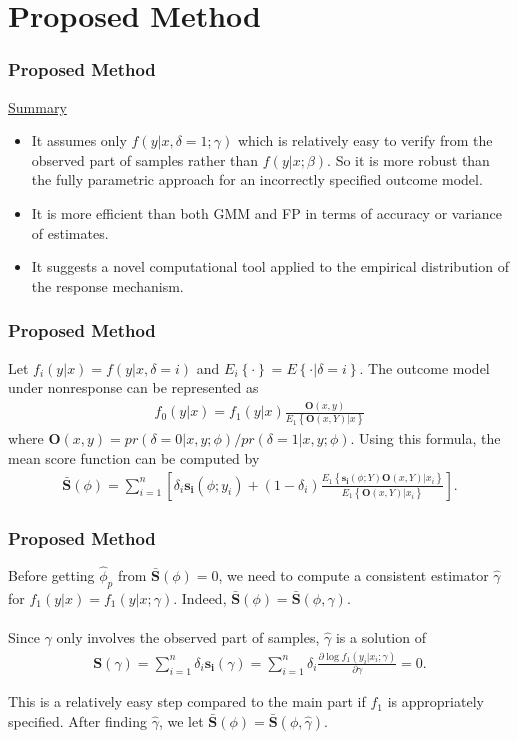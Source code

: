 \documentclass{beamer}
\newcommand{\bra}[1]{\left(#1\right)}
\newcommand{\cbra}[1]{\left\{#1\right\}}
\newcommand{\sbra}[1]{\left[#1\right]}
\newcommand{\e}[1]{$\displaystyle{#1}$}
\newcommand{\al}[1]{\begin{align*}#1\end{align*}}
\begin{document}
\section{Proposed Method}

\begin{frame}
\frametitle{Proposed Method}
\underline{Summary}
\begin{itemize}
\item It assumes only \e{f\bra{y|x, \delta=1; \gamma}} which is relatively easy to verify from the observed part of samples rather than \e{f\bra{y|x; \beta}}. So it is more robust than the fully parametric approach for an incorrectly specified outcome model.
\item It is more efficient than both GMM and FP in terms of accuracy or variance of estimates.
\item It suggests a novel computational tool applied to the empirical distribution of the response mechanism.
\end{itemize}\bigskip
\end{frame}

\begin{frame}
\frametitle{Proposed Method}
Let \e{f_i(y|x) = f(y|x,\delta=i)} and \e{E_i\cbra{\cdot} = E\cbra{\cdot|\delta=i}}.
The outcome model under nonresponse can be represented as
\al{f_0(y|x) = f_1(y|x) \frac{\bm{O}(x, y)}{E_1\cbra{\bm{O}(x, Y)|x}}}\smallskip where
\e{\bm{O}(x, y) = pr(\delta=0|x,y; \phi)/pr(\delta=1|x,y; \phi)}.
Using this formula, the mean score function can be computed by\smallskip
\al{\bar{\bm{S}}\bra{\phi}=\sum_{i=1}^{n} \sbra{
	\delta_{i}\bm{s_i}\bra{\phi; y_i} +
	\bra{1-\delta_i}\frac{E_1\cbra{\bm{s_i}\bra{\phi; Y}\bm{O}\bra{x, Y}|x_i}}
					   {E_1\cbra{\bm{O}\bra{x, Y}|x_i}}}.}
\end{frame}

\begin{frame}
\frametitle{Proposed Method}
Before getting \e{\hat\phi_{p}} from \e{\bar{\bm{S}}\bra{\phi}=0}, we need to compute a consistent estimator \e{\hat\gamma} for \e{f_1(y|x)=f_1(y|x;\gamma)}. Indeed, \e{\bar{\bm{S}}\bra{\phi}=\bar{\bm{S}}\bra{\phi, \gamma}}.\\~\\

Since \e{\gamma} only involves the observed part of samples, \e{\hat\gamma} is a solution of\smallskip
\al{\bm{S}\bra{\gamma} = \sum_{i=1}^{n} \delta_i \bm{s_i}\bra{\gamma}
					= \sum_{i=1}^{n} \delta_i \frac{\partial \log f_1\bra{y_i|x_i;\gamma}}{\partial \gamma} = 0.}\smallskip

This is a relatively easy step compared to the main part if \e{f_1} is appropriately specified. After finding \e{\hat\gamma}, we let \e{\bar{\bm{S}}\bra{\phi}=\bar{\bm{S}}\bra{\phi, \hat\gamma}}.
\end{frame}
\end{document}
